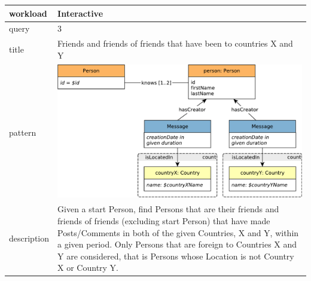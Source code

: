 \renewcommand*{\arraystretch}{1.1}

\noindent\begin{tabularx}{17cm}{|p{1.95cm}|X|}
	\hline
	workload    & Interactive \\ \hline
%
	query       & 3 \\ \hline
%
	title       & Friends and friends of friends that have been to countries X and Y \\ \hline
%
    pattern     & \hfill\includegraphics[scale=\patternscale,margin=0cm .2cm]{patterns/interactive-complex-read-03}\hfill\vadjust{} \\ \hline
%
	description & Given a start Person, find Persons that are their friends and friends of
friends (excluding start Person) that have made Posts/Comments in both
of the given Countries, X and Y, within a given period. Only Persons
that are foreign to Countries X and Y are considered, that is Persons
whose Location is not Country X or Country Y.
 \\ \hline
	

\end{tabularx}
